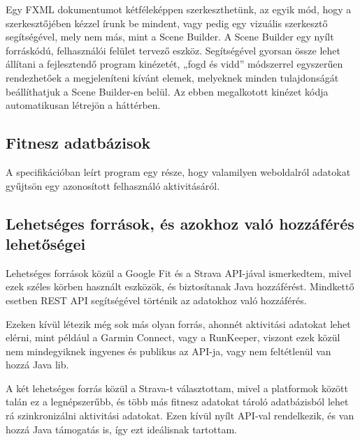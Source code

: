 Egy FXML dokumentumot kétféleképpen szerkeszthetünk, az egyik mód, hogy a szerkesztőjében kézzel írunk be mindent, vagy pedig egy vizuális szerkesztő segítségével, mely nem más, mint a Scene Builder. A Scene Builder egy nyílt forráskódú, felhasználói felület tervező eszköz. Segítségével gyorsan össze lehet állítani a fejlesztendő program kinézetét, „fogd és vidd” módszerrel egyszerűen rendezhetőek a megjeleníteni kívánt elemek, melyeknek minden tulajdonságát beállíthatjuk a Scene Builder-en belül. Az ebben megalkotott kinézet kódja automatikusan létrejön a háttérben.

\subsection{Fitnesz adatbázisok}

A specifikációban leírt program egy része, hogy valamilyen weboldalról adatokat gyűjtsön egy azonosított felhasználó aktivitásáról. 

\subsection*{Lehetséges források, és azokhoz való hozzáférés lehetőségei}

Lehetséges források közül a Google Fit és a Strava API-jával ismerkedtem, mivel ezek széles körben használt eszközök, és biztosítanak Java hozzáférést. Mindkettő esetben REST API segítségével történik az adatokhoz való hozzáférés. 

Ezeken kívül létezik még sok más olyan forrás, ahonnét aktivitási adatokat lehet elérni, mint például a Garmin Connect, vagy a RunKeeper, viszont ezek közül nem mindegyiknek ingyenes és publikus az API-ja, vagy nem feltétlenül van hozzá Java lib. 

A két lehetséges forrás közül a Strava-t választottam, mivel a platformok között talán ez a legnépszerűbb, és több más fitnesz adatokat tároló adatbázisból lehet rá szinkronizálni aktivitási adatokat. Ezen kívül nyílt API-val rendelkezik, és van hozzá Java támogatás is, így ezt ideálisnak tartottam. 
